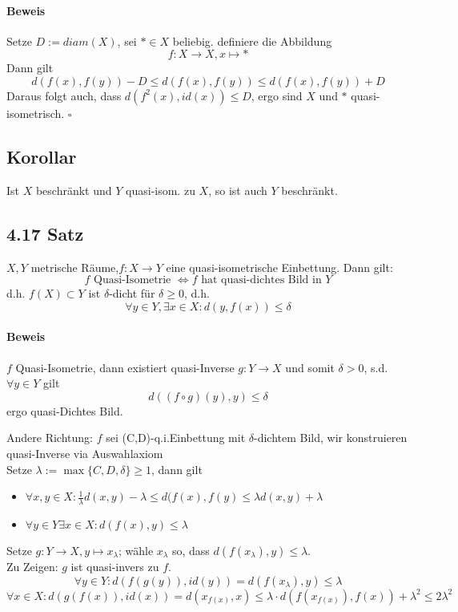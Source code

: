 \documentclass{article}
\newcommand{\qed}{\hfill $\square$}
\begin{document}
\paragraph{Beweis}
Setze $D:= diam(X)$, sei $* \in X$ beliebig. definiere die Abbildung
\[f:X \longrightarrow X, x \longmapsto *\]
Dann gilt
\[d(f(x), f(y)) - D \leq d(f(x),f(y)) \leq d(f(x),f(y)) + D \]
Daraus folgt auch, dass $d(f^2(x), id(x)) \leq D$, ergo sind $X$ und $*$ quasi-isometrisch.
\qed
\subsection{Korollar}
Ist $X$ beschränkt und $Y$ quasi-isom. zu $X$, so ist auch $Y$ beschränkt.

\subsection{4.17 Satz}
$X,Y$ metrische Räume,$f:X\rightarrow Y$ eine quasi-isometrische Einbettung. Dann gilt:
\[f \text{ Quasi-Isometrie }\Longleftrightarrow f \text{ hat quasi-dichtes Bild in }Y \]
d.h. $f(X) \subset Y$ ist $\delta$-dicht für $\delta \geq 0$, d.h.
\[\forall y\in Y, \exists x \in X: d(y,f(x)) \leq \delta \]

\paragraph{Beweis}
$f$ Quasi-Isometrie, dann existiert quasi-Inverse $g : Y \rightarrow X$ und somit $\delta > 0$, s.d. $\forall y \in Y$ gilt
\[d((f\circ g)(y), y) \leq \delta \]
ergo quasi-Dichtes Bild.

Andere Richtung: $f$ sei (C,D)-q.i.Einbettung mit $\delta$-dichtem Bild, wir konstruieren quasi-Inverse via Auswahlaxiom\\
Setze $\lambda := \max\{C,D,\delta\} \geq 1$, dann gilt
\begin{itemize}
	\item $\forall x,y \in X:  \frac{1}{\lambda} d(x,y) - \lambda \leq d(f(x),f(y) \leq {\lambda} d(x,y) + \lambda  $
	\item $\forall y \in Y \exists x \in X: d(f(x),y) \leq \lambda$
\end{itemize}
Setze $g:Y\rightarrow X, y \longmapsto x_\lambda $; wähle $x_\lambda$ so, dass $d(f(x_\lambda), y) \leq \lambda$.\\

Zu Zeigen: $g$ ist quasi-invers zu $f$.\\
\[\forall y\in Y: d(f(g(y)), id(y)) = d(f(x_\lambda), y) \leq \lambda \]
\[\forall x\in X: d(g(f(x)), id(x)) = d(x_{f(x)}, x) \leq \lambda \cdot d(f(x_{f(x)}), f(x)) + \lambda^2 \leq 2\lambda^2 \]
\end{document}
